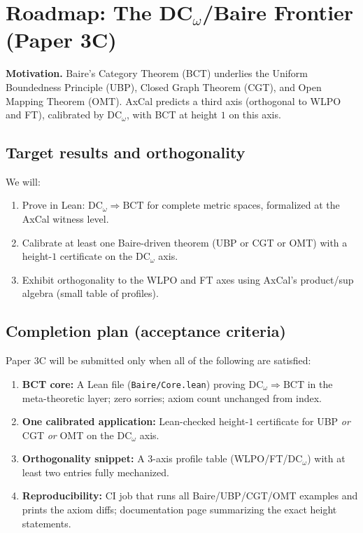 \documentclass[11pt]{article}
\newcommand{\DCw}{\mathrm{DC}_\omega}
\begin{document}
\section{Roadmap: The DC\texorpdfstring{$_\omega$}{ω}/Baire Frontier (Paper 3C)}\label{sec:baire-roadmap}

\begin{mdframed}[style=callout]
\textbf{Motivation.} Baire's Category Theorem (BCT) underlies the Uniform Boundedness Principle (UBP), Closed Graph Theorem (CGT), and Open Mapping Theorem (OMT). AxCal predicts a third axis (orthogonal to WLPO and FT), calibrated by DC$_\omega$, with BCT at height $1$ on this axis.
\end{mdframed}

\subsection{Target results and orthogonality}
We will:
\begin{enumerate}
\item Prove in Lean: \(\DCw \Rightarrow \mathrm{BCT}\) for complete metric spaces, formalized at the AxCal witness level.
\item Calibrate at least one Baire-driven theorem (UBP or CGT or OMT) with a height-$1$ certificate on the DC$_\omega$ axis.
\item Exhibit orthogonality to the WLPO and FT axes using AxCal's product/sup algebra (small table of profiles).
\end{enumerate}

\subsection{Completion plan (acceptance criteria)}
Paper 3C will be submitted only when all of the following are satisfied:
\begin{enumerate}
\item \textbf{BCT core:} A Lean file (\texttt{Baire/Core.lean}) proving \(\DCw \Rightarrow \mathrm{BCT}\) in the meta-theoretic layer; zero sorries; axiom count unchanged from index.
\item \textbf{One calibrated application:} Lean-checked height-$1$ certificate for UBP \emph{or} CGT \emph{or} OMT on the DC$_\omega$ axis.
\item \textbf{Orthogonality snippet:} A 3-axis profile table (WLPO/FT/DC$_\omega$) with at least two entries fully mechanized.
\item \textbf{Reproducibility:} CI job that runs all Baire/UBP/CGT/OMT examples and prints the axiom diffs; documentation page summarizing the exact height statements.
\end{enumerate}
\end{document}
